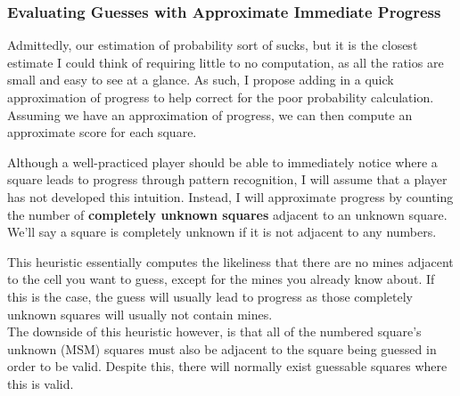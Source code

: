\subsubsection*{Evaluating Guesses with Approximate Immediate Progress}
Admittedly, our estimation of probability sort of sucks, but it is the closest estimate I could think of requiring little to no computation, as all the ratios are small and easy to see at a glance. As such, I propose adding in a quick approximation of progress to help correct for the poor probability calculation. Assuming we have an approximation of progress, we can then compute an approximate score for each square.


Although a well-practiced player should be able to immediately notice where a square leads to progress through pattern recognition, I will assume that a player has not developed this intuition. Instead, I will approximate progress by counting the number of \textbf{completely unknown squares} adjacent to an unknown square. We'll say a square is completely unknown if it is not adjacent to any numbers.


This heuristic essentially computes the likeliness that there are no mines adjacent to the cell you want to guess, except for the mines you already know about. If this is the case, the guess will usually lead to progress as those completely unknown squares will usually not contain mines.\\

The downside of this heuristic however, is that all of the numbered square's unknown (MSM) squares must also be adjacent to the square being guessed in order to be valid. Despite this, there will normally exist guessable squares where this is valid.\\

